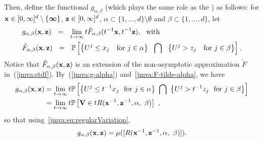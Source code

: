 \noindent
Then, define the  functional $g_{\alpha,\beta}$ (which plays the same role as the \stdf) as follows:  
for $\mathbf x \in [0, \infty]^{d}\setminus\{\boldsymbol{\infty}\}$, $\mathbf z \in [0, \infty]^d$, $\alpha
\subset \{1,\ldots,d\} \setminus \emptyset$ and $\beta \subset
\{1,\ldots,d\}$, let
\begin{align}
&g_{\alpha, \beta}(\mathbf x, \mathbf z) ~~=~~ \lim_{t \to \infty} t \tilde
F_{\alpha, \beta}(t^{-1} \mathbf x, t^{-1} \mathbf z), \text{~~with}
\label{jmva:g-alpha} \\
&\tilde F_{\alpha, \beta}( \mathbf x,  \mathbf z) ~~=~~
 \mathbb{P} \left[ \left\{ U^j \le x_j ~~\text{ for } j \in \alpha
   \right\}~~\bigcap~~ \left\{U^j > z_j  ~~\text{ for } j \in\beta
   \right\}\right].
 \label{jmva:F-tilde-alpha}
\end{align}
 Notice that %
$\tilde F_{\alpha, \beta}( \mathbf x,  \mathbf z)$ is an extension of the
non-asymptotic approximation $\tilde F$ in~(\ref{jmva:stdf}).   %
By~(\ref{jmva:g-alpha}) and~\eqref{jmva:F-tilde-alpha}, we have 
\begin{align*}
  g_{\alpha, \beta}(\mathbf x, \mathbf z) &= \lim_{t \to \infty} t \mathbb{P}
  \left[ \left\{ U^j \le t^{-1} x_j ~\text{ for } j \in \alpha
    \right\}~\bigcap~ \left\{  U^j > t^{-1} z_j  ~\text{ for } j
      \in\beta \right\}\right] \\&= \lim_{t \to \infty} t \mathbb{P}
  \left[ \mathbf V \in t R(\mathbf x^{-1}, \mathbf z^{-1}, \alpha,~\beta) \right]~,
\end{align*}
 so that using~\eqref{jmva:eq:regularVariation},
\begin{align}\label{jmva:g_with_mu}
g_{\alpha, \beta}(\mathbf x, \mathbf z) = \mu([ R(\mathbf x^{-1}, \mathbf z^{-1}, \alpha,~\beta)]).
\end{align}




